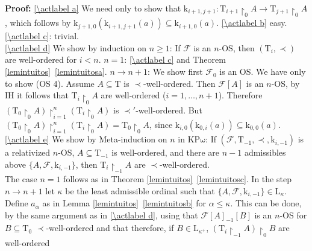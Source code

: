 \documentclass[10pt]{article}
\def \refsub#1#2{\ref{#1#2}}                    %
\def \refact#1{\ref{\actlabel#1}}               %
\def \refcom#1#2{\ref{#1}\ \ref{#1#2}}%
\def\all{\forall}
\def\ar{\rightarrow}
\def\k{\mathrm{k}}
\def\Cl{{\mathcal{C}l}}
\def\T{\mathrm{T}}
\def\L{\mathrm{L}}
\def\kpomega{\mathrm{KP\omega}}
\def\calF{\mathcal{F}}
\begin{document}
%
%
%
{\bf Proof:} 
\refact a We need only to show that 
$\k_{i+1,j+1}: \T_{i+1}  \restriction_0 A \ar \T_{j+1} \restriction_0 A$,
which follows by $\k_{j+1,0}(\k_{i+1,j+1}(a)) \subseteq \k_{i+1,0}(a)$.
\refact b easy.
\refact c: trivial.\\
\refact d We show by induction on $n \geq 1$:
If $\calF$ is an $n$-OS, then $(\T_i,\prec)$ are well-ordered for $i<n$.
$n=1$: \refact c and Theorem \refcom{lemintuitos}a. 
$n \ar n+1$: We show first $\calF_0$ is an OS. We have only to show
(OS 4). Assume $A \subseteq \T$ is $\prec$-well-ordered.
Then $\calF[A]$ is an $n$-OS, by IH it follows that 
$\T_i \restriction_0 A$ are well-ordered ($i=1 ,\ldots, n+1$).
Therefore $(\T_0 \restriction_0 A)\restriction_{i=1}^n (\T_i \restriction_0 A)$
is $\prec'$-well-ordered. But
$(\T_0 \restriction_0 A)\restriction_{i=1}^n (\T_i \restriction_0 A)
= \T_0 \restriction_0 A$, since $\k_{i,0}(\k_{0,i} (a)) \subseteq \k_{0,0}(a)$.\\ 
\refact e We show by Meta-induction on $n$ in $\kpomega$:
If $(\calF,\T_{-1},\prec,\k_{i,-1})$ is
a relativized $n$-OS, $A \subseteq \T_{-1}$ is well-ordered, and there are
$n-1$ admissibles above $\{ A,\calF,\k_{i,-1} \}$, then
$\T_i \restriction_{-1}A$ are $\prec$-well-ordered.\\
The case $n=1$ follows as in Theorem \refcom{lemintuitos}c. 
In the step $n \ar n+1$ 
let $\kappa$ be the least admissible ordinal
such that $\{ A,\calF,\k_{i,-1} \} \in \L_\kappa$. 
Define $a_\alpha$ as in  Lemma \refcom{lemintuitos}b
for $\alpha \leq \kappa$. This can be done, by the same argument
as in \refact d, using that $\calF[A]_{-1}[B]$ is an $n$-OS for
$B \subseteq \T_0$ $\prec$-well-ordered and that therefore,
if $B \in \L_{\kappa^+}$,
$(\T_i \restriction_{-1} A) \restriction_{0}B$ are well-ordered
\end{document}
